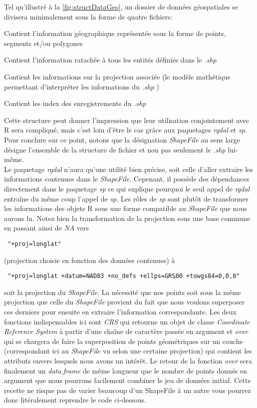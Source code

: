 \noindent
Tel qu'illustré à la \autoref{fig:structDataGeo}, un dossier de données géospatiales se divisera minimalement sous la forme de quatre fichiers:
\begin{description}[style=multiline,leftmargin=1.5cm]
	\item[\emph{.shp}] Contient l'information géographique représentée sous la forme de points, segments et/ou polygones
	\item[\emph{.dbf}] Contient l'information ratachée à tous les entités définies dans le \emph{.shp}
	\item[\emph{.prj}] Contient les informations sur la projection associée (le modèle mathétique permettant d'interpréter les informations du \emph{.shp} \cite{projectionSIG})
	\item[{.shx}] Contient les index des enregistrements du \emph{.shp}
\end{description}
Cette structure peut donner l'impression que leur utilisation conjointement avec R sera compliqué, mais c'est loin d'être le cas grâce aux paquetages \emph{rgdal} et \emph{sp}. Pour conclure sur ce point, notons que la désignation \emph{ShapeFile} au sens large désigne l'ensemble de la structure de fichier et non pas seulement le \emph{.shp} lui-même. \cite{portailSIG} \\

\noindent
Le paquetage \emph{rgdal} n'aura qu'une utilité bien précise, soit celle d'aller extraire les informations contenues dans le \emph{ShapeFile}. Cepenant, il possède des dépendances directement dans le paquetage \emph{sp} ce qui explique pourquoi le seul appel de \emph{rgdal} entraîne du même coup l'appel de \emph{sp}. Les rôles de \emph{sp} sont plutôt de transformer les informations des objets R sous une forme compatible au \emph{ShapeFile} que nous aurons lu. Notez bien la transformation de la projection sous une base commune en passant ainsi de \emph{NA} vers \begin{verbatim} "+proj=longlat" \end{verbatim} (projection choisie en fonction des données contenues) à \begin{verbatim} "+proj=longlat +datum=NAD83 +no_defs +ellps=GRS80 +towgs84=0,0,0" \end{verbatim} soit la projection du \emph{ShapeFile}. La nécessité que nos points soit sous la même projection que celle du \emph{ShapeFile} provient du fait que nous voulons superposer ces derniers pour ensuite en extraire l'information correspondante. Les deux fonctions indispensables ici sont \emph{CRS} qui retourne un objet de classe \emph{Coordinate Reference System} à partir d'une chaîne de caractère passée en argument et \emph{over} qui se chargera de faire la superposition de points géométriques sur un couche (correspondant ici au \emph{ShapeFile} vu selon une certaine projection) qui contient les attributs envers lesquels nous avons un intérêt. Le retour de la fonction \emph{over} sera finalement un \emph{data.frame} de même longueur que le nombre de points donnés en argument que nous pourrons facilement combiner le jeu de données initial. Cette recette ne risque pas de varier beaucoup d'un ShapeFile à un autre vous pourrez donc litéralement reprendre le code ci-dessous. \\


